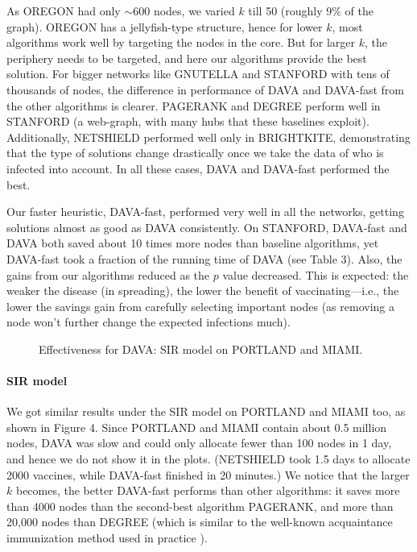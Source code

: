 \documentclass{article}
\begin{document}
As OREGON had only $\sim 600$ nodes, we varied $k$ till 50 (roughly 9\% of the graph). OREGON has a jellyfish-type structure, hence for lower $k$, most algorithms work well by targeting the nodes in the core. But for larger $k$, the periphery needs to be targeted, and here our algorithms provide the best solution. For bigger networks like GNUTELLA and STANFORD with tens of thousands of nodes, the difference in performance of DAVA and DAVA-fast from the other algorithms is clearer. PAGERANK and DEGREE perform well in STANFORD (a web-graph, with many hubs that these baselines exploit). Additionally, NETSHIELD performed well only in BRIGHTKITE, demonstrating that the type of solutions change drastically once we take the data of who is infected into account. In all these cases, DAVA and DAVA-fast performed the best.

Our faster heuristic, DAVA-fast, performed very well in all the networks, getting solutions almost as good as DAVA consistently. On STANFORD, DAVA-fast and DAVA both saved about 10 times more nodes than baseline algorithms, yet DAVA-fast took a fraction of the running time of DAVA (see Table 3). Also, the gains from our algorithms reduced as the $p$ value decreased. This is expected: the weaker the disease (in spreading), the lower the benefit of vaccinating—i.e., the lower the savings gain from carefully selecting important nodes (as removing a node won’t further change the expected infections much).

\begin{figure}[h!]
    \centering
    \caption{Effectiveness for DAVA: SIR model on PORTLAND and MIAMI.}
\end{figure}

\paragraph{SIR model} We got similar results under the SIR model on PORTLAND and MIAMI too, as shown in Figure 4. Since PORTLAND and MIAMI contain about 0.5 million nodes, DAVA was slow and could only allocate fewer than 100 nodes in 1 day, and hence we do not show it in the plots. (NETSHIELD took 1.5 days to allocate 2000 vaccines, while DAVA-fast finished in 20 minutes.) We notice that the larger $k$ becomes, the better DAVA-fast performs than other algorithms: it saves more than 4000 nodes than the second-best algorithm PAGERANK, and more than 20,000 nodes than DEGREE (which is similar to the well-known acquaintance immunization method used in practice \cite{ref7}).
\end{document}
